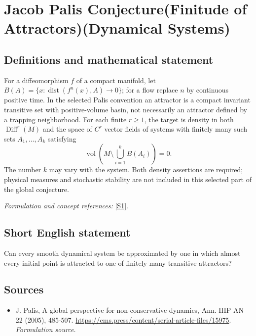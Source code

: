 \documentclass[11pt]{article}
\begin{document}
\section*{\texorpdfstring{Jacob Palis Conjecture(Finitude of Attractors)(Dynamical Systems)}{Jacob Palis Conjecture(Finitude of Attractors)(Dynamical Systems)}}\label{statement}
\subsection{Definitions and mathematical statement}
For a diffeomorphism $f$ of a compact manifold, let
$B(A)=\{x:\operatorname{dist}(f^n(x),A)\to0\}$; for a flow replace $n$ by continuous positive time. In the selected Palis convention an attractor is a compact invariant transitive set with positive-volume basin, not necessarily an attractor defined by a trapping neighborhood. For each finite $r\ge1$, the target is density in both $\operatorname{Diff}^r(M)$ and the space of $C^r$ vector fields of systems with finitely many such sets $A_1,\ldots,A_k$ satisfying
\[
 \operatorname{vol}\left(M\setminus\bigcup_{i=1}^k B(A_i)\right)=0.
\]
The number $k$ may vary with the system. Both density assertions are required; physical measures and stochastic stability are not included in this selected part of the global conjecture.
\par\smallskip\textit{Formulation and concept references:} \href{https://ems.press/content/serial-article-files/15975}{[S1]}.

\subsection{Short English statement}
Can every smooth dynamical system be approximated by one in which almost every initial point is attracted to one of finitely many transitive attractors?
\subsection{Sources}
\begin{itemize}
\item[S1]J. Palis, A global perspective for non-conservative dynamics, Ann. IHP AN 22 (2005), 485-507.
\url{https://ems.press/content/serial-article-files/15975}.
\textit{Formulation source.}
\end{itemize}
\end{document}
